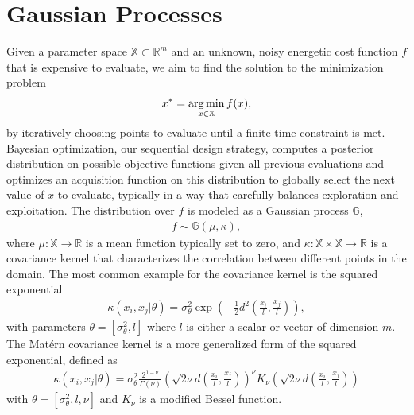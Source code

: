 \section{Gaussian Processes}
\label{gp}

Given a parameter space $\mathbb{X} \subset \mathbb{R}^m$ and an unknown, noisy energetic cost function $f$ that is expensive to evaluate, we aim to find the solution to the minimization problem
\begin{align}
  x^* = \operatorname*{arg\,min}_{x \in \mathbb{X}} f(x),
\end{align}
by iteratively choosing points to evaluate until a finite time constraint is met. Bayesian optimization, our sequential design strategy, computes a posterior distribution on possible objective functions given all previous evaluations and optimizes an acquisition function on this distribution to globally select the next value of $x$ to evaluate, typically in a way that carefully balances exploration and exploitation. The distribution over $f$ is modeled as a Gaussian process \citep{Rasmussen2006} $\mathbb{G}$, 
\begin{align}
  f \sim \mathbb{G}(\mu, \kappa), 
\end{align}
where $\mu : \mathbb{X} \rightarrow \mathbb{R}$ is a mean function typically set to zero, and $\kappa : \mathbb{X}\times \mathbb{X} \rightarrow \mathbb{R}$ is a covariance kernel that characterizes the correlation between different points in the domain. The most common example for the covariance kernel is the squared exponential
\begin{align}
  \kappa(x_i, x_j \vert \theta) = \sigma_\theta^2 \exp(-\frac{1}{2}d^2(\frac{x_i}{l}, \frac{x_j}{l})),
\end{align}
with parameters $\theta = [\sigma_\theta^2, l]$ where $l$ is either a scalar or vector of dimension $m$. The Matérn covariance kernel is a more generalized form of the squared exponential, defined as
\begin{align}
	\kappa(x_i, x_j \vert \theta) = \sigma_\theta^2\frac{2^{1-\nu}}{\Gamma(\nu)}(\sqrt{2\nu} d(\frac{x_i}{l}, \frac{x_j}{l}))^\nu K_\nu (\sqrt{2\nu} d(\frac{x_i}{l}, \frac{x_j}{l}))
\end{align}
with $\theta= [\sigma_\theta^2, l, \nu]$ and $K_\nu$ is a modified Bessel function.
